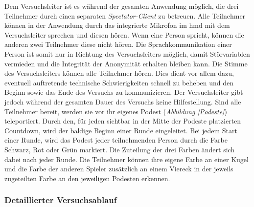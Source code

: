 \documentclass[a4paper,11pt]{article}%
\renewcommand{\\}{\vspace*{0.5\baselineskip} \newline}
\begin{document}
Dem Versuchsleiter ist es während der gesamten Anwendung möglich, die drei Teilnehmer durch einen separaten \textit{Spectator-Client} zu betreuen. Alle Teilnehmer können in der Anwendung durch das integrierte Mikrofon im \ac{hmd} mit dem Versuchsleiter sprechen und diesen hören. Wenn eine Person spricht, können die anderen zwei Teilnehmer diese nicht hören. Die Sprachkommunikation einer Person ist somit nur in Richtung des Versuchsleiters möglich, damit Störvariablen vermieden und die Integrität der Anonymität erhalten bleiben kann. Die Stimme des Versuchsleiters können alle Teilnehmer hören. Dies dient vor allem dazu, eventuell auftretende technische Schwierigkeiten schnell zu beheben und den Beginn sowie das Ende des Versuchs zu kommunizieren. Der Versuchsleiter gibt jedoch während der gesamten Dauer des Versuchs keine Hilfestellung.
Sind alle Teilnehmer bereit, werden sie vor ihr eigenes Podest (\textit{Abbildung \ref{Podeste}}) teleportiert. Durch den, für jeden sichtbar in der Mitte der Podeste platzierten Countdown, wird der baldige Beginn einer Runde eingeleitet. Bei jedem Start einer Runde, wird das Podest jeder teilnehmenden Person durch die Farbe Schwarz, Rot oder Grün markiert. Die Zuteilung der drei Farben ändert sich dabei nach jeder Runde. Die Teilnehmer können ihre eigene Farbe an einer Kugel und die Farbe der anderen Spieler zusätzlich an einem Viereck in der jeweils zugeteilten Farbe an den jeweiligen Podesten erkennen.

	\subsubsection{Detaillierter Versuchsablauf}
\end{document}
